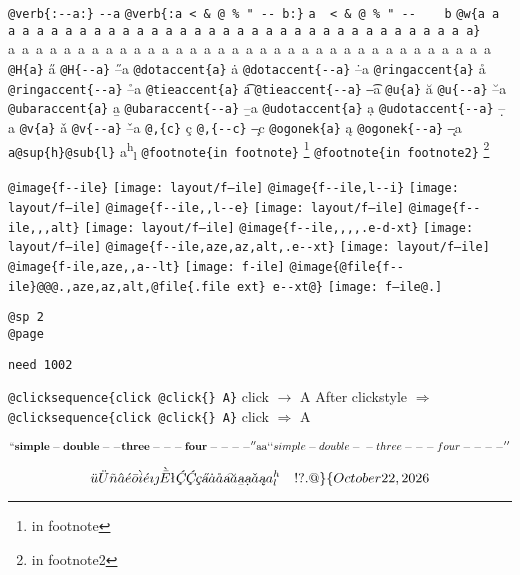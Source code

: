 \documentclass{book}
\renewcommand{\includegraphics}[1]{\fbox{FIG #1}}
\begin{document}
\texttt{@verb\{:{-}{-}a:\}} \verb:--a:
\texttt{@verb\{:a  < \& @ \% " {-}{-}    b:\}} \verb:a  < & @ % " --    b:
\texttt{@w\{a a a a a a a a a a a a a a a a a a a a a a a a a a a a a a a a a a a\}} \hbox{a a a a a a a a a a a a a a a a a a a a a a a a a a a a a a a a a a a}
\texttt{@H\{a\}} \H{a}
\texttt{@H\{{-}{-}a\}} \H{--a}
\texttt{@dotaccent\{a\}} \.{a}
\texttt{@dotaccent\{{-}{-}a\}} \.{--a}
\texttt{@ringaccent\{a\}} \r{a}
\texttt{@ringaccent\{{-}{-}a\}} \r{--a}
\texttt{@tieaccent\{a\}} \t{a}
\texttt{@tieaccent\{{-}{-}a\}} \t{--a}
\texttt{@u\{a\}} \u{a}
\texttt{@u\{{-}{-}a\}} \u{--a}
\texttt{@ubaraccent\{a\}} \b{a}
\texttt{@ubaraccent\{{-}{-}a\}} \b{--a}
\texttt{@udotaccent\{a\}} \d{a}
\texttt{@udotaccent\{{-}{-}a\}} \d{--a}
\texttt{@v\{a\}} \v{a}
\texttt{@v\{{-}{-}a\}} \v{--a}
\texttt{@,\{c\}} \c{c}
\texttt{@,\{{-}{-}c\}} \c{--c}
\texttt{@ogonek\{a\}} \k{a}
\texttt{@ogonek\{{-}{-}a\}} \k{--a}
\texttt{a@sup\{h\}@sub\{l\}} a\textsuperscript{h}\textsubscript{l}
\texttt{@footnote\{in footnote\}} \footnote{in footnote}
\texttt{@footnote\{in footnote2\}} \footnote{in footnote2}

\texttt{@image\{f{-}{-}ile\}} \texttt{[image: layout/f--ile]}
\texttt{@image\{f{-}{-}ile,l{-}{-}i\}} \texttt{[image: layout/f--ile]}
\texttt{@image\{f{-}{-}ile,,l{-}{-}e\}} \texttt{[image: layout/f--ile]}
\texttt{@image\{f{-}{-}ile,,,alt\}} \texttt{[image: layout/f--ile]}
\texttt{@image\{f{-}{-}ile,,,,.e-d-xt\}} \texttt{[image: layout/f--ile]}
\texttt{@image\{f{-}{-}ile,aze,az,alt,.e{-}{-}xt\}} \texttt{[image: layout/f--ile]}
\texttt{@image\{f-ile,aze,,a{-}{-}lt\}} \texttt{[image: f-ile]}
\texttt{@image\{@file\{f{-}{-}ile\}@@@.,aze,az,alt,@file\{.file ext\} e{-}{-}xt@\}} \texttt{[image: f--ile@.]}

\texttt{@sp 2}\leavevmode{}\\
\baselineskip %
\texttt{@page}\leavevmode{}\\
\newpage{}%
\phantom{blabla}%

\texttt{need 1002}
\needspace{1.002pt}%

\texttt{@clicksequence\{click @click\{\} A\}} click $\rightarrow{}$ A
After clickstyle $\Rightarrow{}$
\texttt{@clicksequence\{click @click\{\} A\}} click $\Rightarrow{}$ A

$$
\mathbf{``simple-double--three---four----''} \hbox{aa}
`\hbox{}`simple-double-\hbox{}-three---four----'\hbox{}'
$$

$$
\ddot{u} \ddot{U} \tilde{n} \hat{a} \acute{e} \bar{o} \grave{i} \acute{e} \imath{} \jmath{} \grave{\bar{E}}
\mathord{\text{\l{}}} \textsl{\c{\'{C}}} \textsl{\c{\'{C}}} \textsl{\c{c}} \textsl{\H{a}} \dot{a} \mathring{a} \textsl{\t{a}}
\breve{a} \textsl{\b{a}} \textsl{\d{a}} \check{a} \textsl{\k{a}} a^{h}_{l}
 \ {}\ {} \ {}\-{}   ! ? . @ \} \{ 
\today{}
$$
\end{document}
